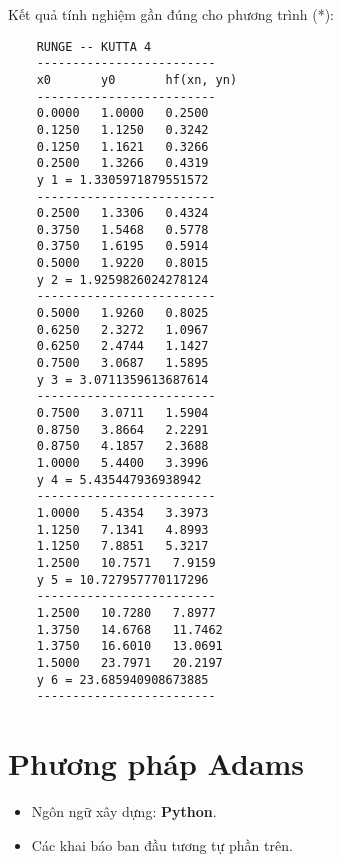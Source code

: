 Kết quả tính nghiệm gần đúng cho phương trình (*):
\begin{lstlisting}
	RUNGE -- KUTTA 4
	-------------------------
	x0       y0       hf(xn, yn)
	-------------------------
	0.0000   1.0000   0.2500
	0.1250   1.1250   0.3242
	0.1250   1.1621   0.3266
	0.2500   1.3266   0.4319
	y 1 = 1.3305971879551572
	-------------------------
	0.2500   1.3306   0.4324
	0.3750   1.5468   0.5778
	0.3750   1.6195   0.5914
	0.5000   1.9220   0.8015
	y 2 = 1.9259826024278124
	-------------------------
	0.5000   1.9260   0.8025
	0.6250   2.3272   1.0967
	0.6250   2.4744   1.1427
	0.7500   3.0687   1.5895
	y 3 = 3.0711359613687614
	-------------------------
	0.7500   3.0711   1.5904
	0.8750   3.8664   2.2291
	0.8750   4.1857   2.3688
	1.0000   5.4400   3.3996
	y 4 = 5.435447936938942
	-------------------------
	1.0000   5.4354   3.3973
	1.1250   7.1341   4.8993
	1.1250   7.8851   5.3217
	1.2500   10.7571   7.9159
	y 5 = 10.727957770117296
	-------------------------
	1.2500   10.7280   7.8977
	1.3750   14.6768   11.7462
	1.3750   16.6010   13.0691
	1.5000   23.7971   20.2197
	y 6 = 23.685940908673885
	-------------------------
\end{lstlisting}

\section{Phương pháp Adams}
\begin{itemize}
	\item Ngôn ngữ xây dựng: \textbf{Python}.
	\item Các khai báo ban đầu tương tự phần trên.
\end{itemize}

